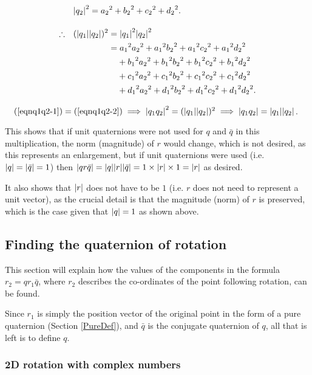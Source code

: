 \documentclass[10pt]{article}
\begin{document}
\begin{alignat}{2}
    & \abs{q_2}^2 = {a_2}^2 + {b_2}^2 + {c_2}^2 + {d_2}^2. \nonumber \\[10pt]
    \therefore \quad & (\abs{q_1}\abs{q_2})^2 = \abs{q_1}^2\abs{q_2}^2 \nonumber \\
             & \phantom{(\abs{q_1}\abs{q_2})^2} = {a_1}^2{a_2}^2 + {a_1}^2{b_2}^2 + {a_1}^2{c_2}^2 + {a_1}^2{d_2}^2 \label{eqnq1q2-2} \\
             & \phantom{(\abs{q_1}\abs{q_2})^2=} + {b_1}^2{a_2}^2 + {b_1}^2{b_2}^2 + {b_1}^2{c_2}^2 + {b_1}^2{d_2}^2 \nonumber \\
             & \phantom{(\abs{q_1}\abs{q_2})^2=} + {c_1}^2{a_2}^2 + {c_1}^2{b_2}^2 + {c_1}^2{c_2}^2 + {c_1}^2{d_2}^2 \nonumber \\
             & \phantom{(\abs{q_1}\abs{q_2})^2=} + {d_1}^2{a_2}^2 + {d_1}^2{b_2}^2 + {d_1}^2{c_2}^2 + {d_1}^2{d_2}^2. \nonumber
\end{alignat}
\endgroup

$\quad (\ref{eqnq1q2-1}) = (\ref{eqnq1q2-2}) \implies \abs{q_1q_2}^2 = (\abs{q_1}\abs{q_2})^2 \implies \abs{q_1q_2} = \abs{q_1}\abs{q_2}$.

This shows that if unit quaternions were not used for $q$ and $\bar{q}$ in this multiplication, the norm (magnitude) of $r$ would change, which is not desired, as this represents an enlargement, but if unit quaternions were used (i.e. $\abs{q} = \abs{\bar{q}} = 1$) then $\abs{qr\bar{q}} = \abs{q}\abs{r}\abs{\bar{q}} = 1\times\abs{r}\times1 = \abs{r}$ as desired.

It also shows that $\abs{r}$ does not have to be $1$ (i.e. $r$ does not need to represent a unit vector), as the crucial detail is that the magnitude (norm) of $r$ is preserved, which is the case given that $\abs{q} = 1$ as shown above.

\subsection{Finding the quaternion of rotation}

This section will explain how the values of the components in the formula $r_2 = qr_1\bar{q}$, where $r_2$ describes the co-ordinates of the point following rotation, can be found.

Since $r_1$ is simply the position vector of the original point in the form of a pure quaternion (Section \ref{PureDef}), and $\bar{q}$ is the conjugate quaternion of $q$, all that is left is to define $q$.

\subsubsection{2D rotation with complex numbers} \label {Complex2DRotation}
\end{document}
